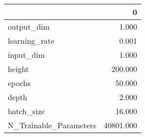 \begin{tabular}{lr}
\toprule
{} &          0 \\
\midrule
output\_dim             &      1.000 \\
learning\_rate          &      0.001 \\
input\_dim              &      1.000 \\
height                 &    200.000 \\
epochs                 &     50.000 \\
depth                  &      2.000 \\
batch\_size             &     16.000 \\
N\_Trainable\_Parameters &  40801.000 \\
\bottomrule
\end{tabular}
